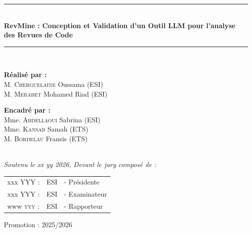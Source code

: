 \documentclass[a4paper,12pt]{report}
\begin{document}
\begin{titlepage}
    \rule{\linewidth}{0.3mm} \\[0.4cm]
    {\huge \bfseries RevMine : Conception et Validation d'un Outil LLM pour l'analyse des Revues de Code \\[0.4cm]}
    \rule{\linewidth}{0.3mm} \\[1cm]
    \vspace{10mm}

    \noindent
\begin{minipage}{0.48\textwidth}
    \begin{flushleft} \large
        \textbf{Réalisé par :}\\
        M. \textsc{Cherguelaine} Oussama (ESI)\\
        M. \textsc{Merabet} Mohamed Riad (ESI)
    \end{flushleft}
\end{minipage}
\hfill
\begin{minipage}{0.48\textwidth}
    \begin{flushright} \large
        \textbf{Encadré par :} \\
        Mme. \textsc{Abdellaoui} Sabrina (ESI)\\
        Mme. \textsc{Kansab} Samah (ETS)\\
        M. \textsc{Bordelau} Fransis (ETS)
    \end{flushright}
\end{minipage}\\[1cm]

    {\large \textit{Soutenu le xx yy 2026, Devant le jury composé de : }}\\[0.5cm]

    \centering
    \begin{tabular}{lll}
        \large xxx \textsc{YYY} : & \large ESI & \large - Présidente \\[0.1cm]
        \large xxx \textsc{YYY} : & \large ESI & \large - Examinateur \\[0.1cm]
        \large www \textsc{yyy} : & \large ESI & \large - Rapporteur
    \end{tabular}

    \vspace{15mm}
    {\large Promotion : 2025/2026}

\end{titlepage}
\end{document}
